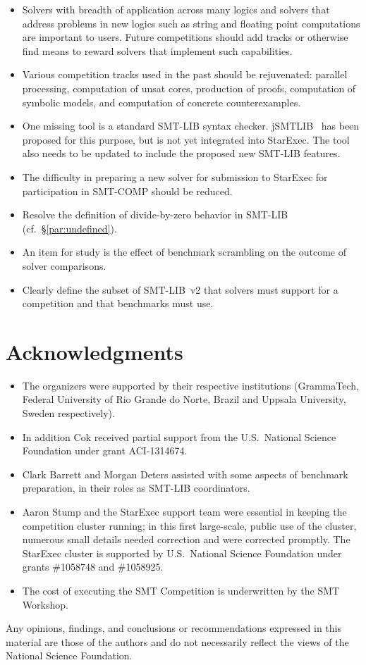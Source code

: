 \documentclass[twoside,11pt]{article}
\begin{document}
\begin{itemize}
\item Solvers with breadth of application across many logics and solvers that address problems in new logics such as string and floating point computations are important to users. Future competitions should add tracks or otherwise find means to reward solvers that implement such capabilities.
\item Various competition tracks used in the past should be rejuvenated: parallel processing, computation of unsat cores, production of proofs, computation of symbolic models, and computation of concrete counterexamples.
\item One missing tool is a standard SMT-LIB syntax checker. jSMTLIB~\cite{cok2011jsmtlib} has been proposed for this purpose, but is not yet integrated into StarExec. The tool also needs to be updated to include the proposed new SMT-LIB features.
\item The difficulty in preparing a new solver for submission to StarExec for participation in SMT-COMP should be reduced.
\item Resolve the definition of divide-by-zero behavior in SMT-LIB (cf.~\S\ref{par:undefined}).
\item An item for study is the effect of benchmark scrambling on the outcome of solver comparisons.
\item Clearly define the subset of SMT-LIB~v2 that solvers must support for a competition and that benchmarks must use.
\end{itemize}

\section*{Acknowledgments}

\begin{itemize}
\item The organizers were supported by their respective institutions (GrammaTech, Federal University of Rio Grande do Norte, Brazil and Uppsala University, Sweden respectively).

\item In addition Cok received partial support from the U.S.\ National Science Foundation
under grant ACI-1314674.

\item Clark Barrett and Morgan Deters assisted with some aspects of benchmark preparation,
in their roles as SMT-LIB coordinators.

\item Aaron Stump and the StarExec support team were essential in keeping the competition cluster running;
in this first large-scale, public use of the cluster, numerous small details needed correction and were corrected promptly.
%
The StarExec cluster is supported by
U.S.\ National Science Foundation under grants \#1058748 and \#1058925.
%
\item The cost of executing the SMT Competition is underwritten by the SMT Workshop.
\end{itemize}

Any opinions,
findings, and conclusions or recommendations expressed in this
material are those of the authors and do not necessarily reflect the
views of the National Science Foundation.



\end{document}

